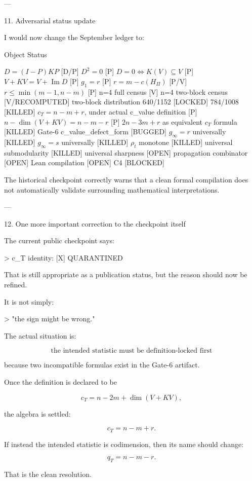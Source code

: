 ---

11. Adversarial status update

I would now change the September ledger to:

Object	Status

\(D=(I-P)KP\)	[D/P]
\(D^2=0\)	[P]
\(D=0\iff K(V)\subseteq V\)	[P]
\(V+KV=V+\operatorname{Im}D\)	[P]
\(g_1=r\)	[P]
\(r=m-c(H_\Pi)\)	[P/V]
\(r\le\min(m-1,n-m)\)	[P]
n=4 full census	[V]
n=4 two-block census	[V/RECOMPUTED]
two-block distribution 640/1152	[LOCKED]
784/1008	[KILLED]
\(c_T=n-m+r\), under actual c_value definition	[P]
\(n-\dim(V+KV)=n-m-r\)	[P]
\(2n-3m+r\) as equivalent \(c_T\) formula	[KILLED]
Gate-6 c_value_defect_form	[BUGGED]
\(g_\infty=r\) universally	[KILLED]
\(g_\infty=s\) universally	[KILLED]
\(\rho_t\) monotone	[KILLED]
universal submodularity	[KILLED]
universal sharpness	[OPEN]
propagation combinator	[OPEN]
Lean compilation	[OPEN]
C4	[BLOCKED]


The historical checkpoint correctly warns that a clean formal compilation does not automatically validate surrounding mathematical interpretations. 


---

12. One more important correction to the checkpoint itself

The current public checkpoint says:

> c_T identity: [X] QUARANTINED



That is still appropriate as a publication status, but the reason should now be refined.

It is not simply:

> "the sign might be wrong."



The actual situation is:

\[
\boxed{
\text{the intended statistic must be definition-locked first}
}
\]

because two incompatible formulas exist in the Gate-6 artifact.

Once the definition is declared to be

\[
c_T=n-2m+\dim(V+KV),
\]

the algebra is settled:

\[
\boxed{c_T=n-m+r.}
\]

If instead the intended statistic is codimension, then its name should change:

\[
\boxed{q_T=n-m-r.}
\]

That is the clean resolution.



